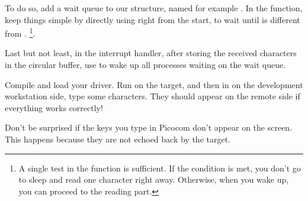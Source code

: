 To do so, add a wait queue to our  structure,
named for example . In the  function,
keep things simple by directly using 
right from the start, to wait until 
is different from . \footnote{A single test in the 
 function is sufficient. If the
condition is met, you don't go to sleep and read one character right away.
Otherwise, when you wake up, you can proceed to the reading part.}.

Last but not least, in the interrupt handler,
after storing the received characters in the circular buffer, use
 to wake up all processes waiting on the wait queue.

Compile and load your driver. Run 
on the target, and then in  on the development
workstation side, type some characters. They should appear on the
remote side if everything works correctly!

Don't be surprised if the keys you type in Picocom don't appear on the
screen. This happens because they are not echoed back by the target.
